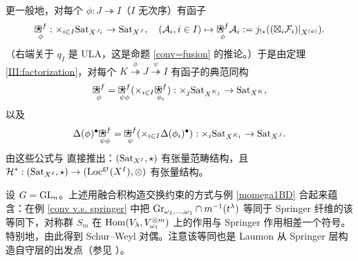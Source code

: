 \begin{rmk}\label{symmetry on fusion}
更一般地，对每个 $\phi: J\twoheadrightarrow I$（$I$ 无次序）有函子
\[\underset{\phi}{\fstar}: \times_{i\in I}\Sat_{X^{J_i}}\to \Sat_{X^J},\quad ( \mA_{i}, i\in I)\mapsto \underset{\phi}{\fstar}\mA_i:=j_{!*}((\boxtimes_i \mF_i)|_{X^{(\phi)}}).\]
（右端关于 $q_I$ 是 ULA，这是命题 \ref{conv=fusion} 的推论。）于是由定理 \ref{III:factorization}，对每个 $K\stackrel{\phi}{\twoheadrightarrow} J\stackrel{\psi}{\twoheadrightarrow} I$ 有函子的典范同构
\begin{equation}\label{fusion prod}
\underset{\phi}{\fstar}= \underset{\psi\phi}{\fstar}(\times_{i\in I} \underset{\phi_i}{\fstar}): \times_{j} \Sat_{X^{K_j}}\to \Sat_{X^K},
\end{equation}
以及
\begin{equation}
\Delta(\phi)^\bullet \underset{\psi\phi}{\fstar}= \underset{\psi}{\fstar}(\times_{i\in I}\Delta(\phi_i)^\bullet): \times_{i}\Sat_{X^{K_i}}\to \Sat_{X^J}.
\end{equation}
由这些公式与 \cite[Proposition 1.5]{DM} 直接推出：$({\operatorname{Sat}}_{X^I},\text{$\star$})$ 有张量范畴结构，且 ${\mathcal H}^*: ({\operatorname{Sat}}_{X^I},\text{$\star$})\to (\operatorname{Loc}^{\operatorname{gr}}(X^I),\otimes)$ 有张量结构。
\end{rmk}

\begin{ex}
设 $G={\operatorname{GL}}_n$。上述用融合积构造交换约束的方式与例 \ref{momega1BD} 合起来蕴含：在例 \ref{conv v.s. springer} 中把 ${\operatorname{Gr}}_{\omega_1,\ldots,\omega_1}\cap m^{-1}(t^{\lambda})$ 等同于 Springer 纤维的该等同下，对称群 $S_m$ 在 ${\operatorname{Hom}}(V_{\lambda}, V_{\omega_1}^{\otimes m})$ 上的作用与 Springer 作用相差一个符号。特别地，由此得到 Schur--Weyl 对偶。注意该等同也是 Laumon 从 Springer 层构造自守层的出发点（参见 \cite{FGKV}）。
\end{ex}
